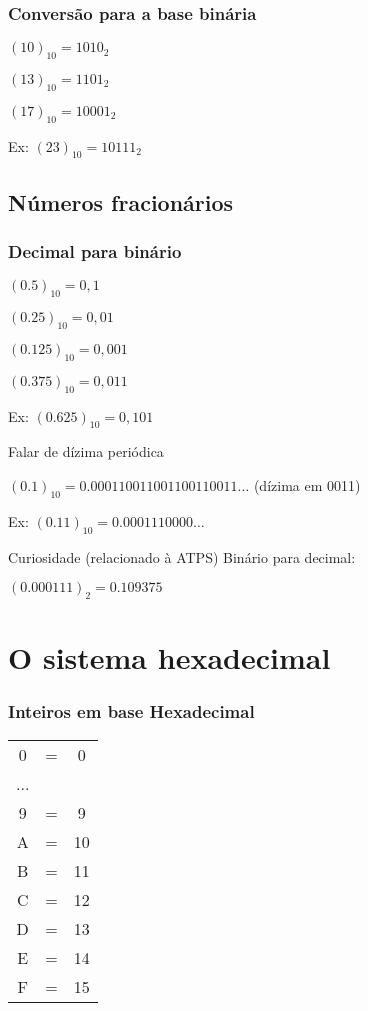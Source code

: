 \documentclass[a4paper]{article}
\begin{document}
\subsubsection*{Conversão para a base binária}

$(10)_{10} = 1010_2$

$(13)_{10} = 1101_2$

$(17)_{10} = 10001_2$

Ex: $(23)_{10} = 10111_2$

\subsection*{Números fracionários}
\subsubsection*{Decimal para binário}

$(0.5)_{10} = 0,1$

$(0.25)_{10} = 0,01$

$(0.125)_{10} = 0,001$

$(0.375)_{10} = 0,011$

Ex: $(0.625)_{10} = 0,101$
 
Falar de dízima periódica 

$(0.1)_{10} = 0.000110011001100110011\ldots$ (dízima em 0011) 
 
Ex: $(0.11)_{10} = 0.0001110000\ldots$
 
Curiosidade (relacionado à ATPS) Binário para decimal: 

$(0.000111)_2 = 0.109375$

\section*{O sistema hexadecimal}

\subsubsection*{Inteiros em base Hexadecimal}

\begin{tabular}{ccc}
  0 &=& 0\\
  ...\\
  9 &=& 9\\
  A &=& 10\\
  B &=& 11\\
  C &=& 12\\
  D &=& 13\\
  E &=& 14\\
  F &=& 15\\
\end{tabular}
\end{document}
